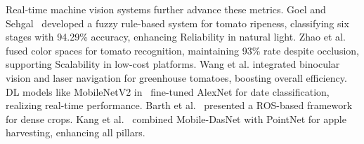 \documentclass{ieeeaccess}
\begin{document}
Real-time machine vision systems further advance these metrics. 
Goel and Sehgal~\cite{goel2015fuzzy} developed a fuzzy rule-based system for tomato ripeness, classifying six stages with 94.29\% accuracy, enhancing Reliability in natural light. 
Zhao et al.~\cite{zhao2016robust} fused color spaces for tomato recognition, maintaining 93\% rate despite occlusion, supporting Scalability in low-cost platforms.
Wang et al.\cite{lili2017development} integrated binocular vision and laser navigation for greenhouse tomatoes, boosting overall efficiency.
DL models like MobileNetV2 in~\cite{altaheri2019date} fine-tuned AlexNet for date classification, realizing real-time performance. 
Barth et al.~\cite{barth2016design} presented a ROS-based framework for dense crops.
Kang et al.~\cite{kang2020real}  combined Mobile-DasNet with PointNet for apple harvesting, enhancing all pillars.
\end{document}
